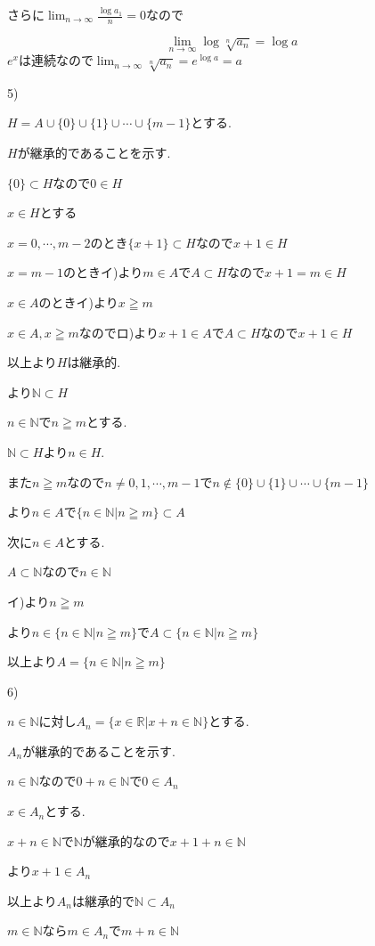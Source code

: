 \documentclass{jsarticle}
\begin{document}
さらに$\displaystyle\lim_{n\to\infty} \frac{\log a_1}{n} = 0$なので


\[\lim_{n\to\infty}\log \sqrt[n]{a_n} = \log a\]
$e^x$は連続なので$\displaystyle\lim_{n\to\infty}\sqrt[n]{a_n} = e^{\log a} = a$

5)

$H = A\cup \{0\} \cup \{1\} \cup \cdots \cup \{m-1\}$とする.

$H$が継承的であることを示す.

$\{0\}\subset H$なので$0\in H$

$x\in H$とする

$x = 0,\cdots , m-2$のとき$\{x+1\}\subset H$なので$x+1\in H$

$x = m-1$のときイ)より$m\in A$で$A\subset H$なので$x+1=m\in H$

$x\in A$のときイ)より$x\geqq m$

$x\in A,x\geqq m$なのでロ)より$x+1\in A$で$A\subset H$なので$x+1\in H$

以上より$H$は継承的.

より$\mathbb{N}\subset H$

$n\in \mathbb{N}$で$n\geqq m$とする.

$\mathbb{N}\subset H$より$n\in H$.

また$n\geqq m$なので$n \neq 0,1,\cdots , m-1$で$n\notin  \{0\} \cup \{1\} \cup \cdots \cup \{m-1\}$

より$n\in A$で$\{n\in \mathbb{N}|n\geqq m\}\subset A$

次に$n\in A$とする.

$A\subset \mathbb{N}$なので$n\in\mathbb{N}$

イ)より$n\geqq m$

より$n\in \{n\in \mathbb{N}|n\geqq m\}$で$A\subset \{n\in \mathbb{N}|n\geqq m\}$

以上より$A=\{n\in \mathbb{N}|n\geqq m\}$

6)

$n\in \mathbb{N}$に対し$A_n=\{x\in \mathbb{R}|x+n\in\mathbb{N}\}$とする.

$A_n$が継承的であることを示す.

$n\in \mathbb{N}$なので$0+n\in \mathbb{N}$で$0\in A_n$

$x\in A_n$とする.

$x+n\in \mathbb{N}$で$\mathbb{N}$が継承的なので$x+1+n\in \mathbb{N}$

より$x+1\in A_n$

以上より$A_n$は継承的で$\mathbb{N} \subset A_n$

$m\in \mathbb{N}$なら$m\in A_n$で$m+n\in\mathbb{N}$
\end{document}
